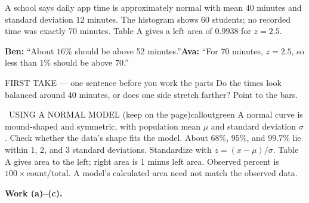 \documentclass[11pt]{article}
\begin{document}


A school says daily app time is approximately normal with mean $40$ minutes and standard deviation $12$ minutes. The histogram shows 60 students; no recorded time was exactly 70 minutes. Table A gives a left area of $0.9938$ for $z=2.5$.\par\smallskip \textbf{Ben:} ``About $16\%$ should be above 52 minutes.''\quad \textbf{Ava:} ``For 70 minutes, $z=2.5$, so less than $1\%$ should be above 70.''\par
\begin{center}
\end{center}
\begin{firsttakebox}{FIRST TAKE --- one sentence before you work the parts}
Do the times look balanced around 40 minutes, or does one side stretch farther? Point to the bars.
\workspace{0.9in}
\end{firsttakebox}

\begin{callout}{\IconBook\ USING A NORMAL MODEL (keep on the page)}{calloutgreen}
A normal curve is mound-shaped and symmetric, with population mean $\mu$ and standard deviation $\sigma$. Check whether the data's shape fits the model. About $68\%$, $95\%$, and $99.7\%$ lie within 1, 2, and 3 standard deviations. Standardize with $z=(x-\mu)/\sigma$. Table A gives area to the left; right area is 1 minus left area. Observed percent is $100\times\text{count}/\text{total}$. A model's calculated area need not match the observed data.
\end{callout}

\newpage
\textbf{Work (a)--(c).}\par\smallskip
\end{document}
